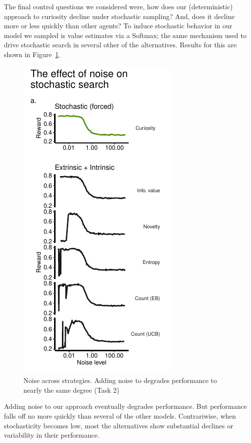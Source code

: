 The final control questions we considered were, how does our (deterministic) approach to curiosity decline under stochastic sampling? And, does it decline more or less quickly than other agents? To induce stochastic behavior in our model we sampled is value estimates via a Softmax; the same mechanism used to drive stochastic search in several other of the alternatives. Results for this are shown in Figure~\ref{fig:noise}.

\begin{figure}
	\includegraphics[width=0.4\linewidth]{img/forced2.pdf} 
	\caption{Noise across strategies. Adding noise to degrades performance to nearly the same degree (Task 2)}
	\label{fig:noise}
\end{figure}

Adding noise to our approach eventually degrades performance. But performance  falls off no more quickly than several of the other models. Contrariwise, when stochasticity becomes low, most the alternatives show substantial declines or variability in their performance. 